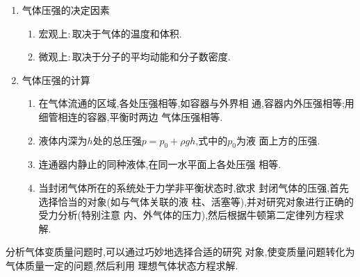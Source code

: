 \begin{enumerate}
\begin{enumerate}
\end{enumerate}


\end{enumerate}		


\begin{enumerate}
\renewcommand{\labelenumi}{\arabic{enumi}.}
\item
气体压强的决定因素
\begin{enumerate}
\renewcommand{\labelenumii}{(\arabic{enumii})}

\item 
宏观上$ : $取决于气体的温度和体积.

\item 
微观上$ : $取决于分子的平均动能和分子数密度.


\end{enumerate}
\item 
气体压强的计算	
\begin{enumerate}
\renewcommand{\labelenumii}{(\arabic{enumii})}

\item 
在气体流通的区域,各处压强相等,如容器与外界相
通,容器内外压强相等;用细管相连的容器,平衡时两边
气体压强相等.

\item 
液体内深为$ h $处的总压强$ p=p_{0}+\rho gh $,式中的$ p_{0} $为液
面上方的压强.

\item 
连通器内静止的同种液体,在同一水平面上各处压强
相等.

\item 
当封闭气体所在的系统处于力学非平衡状态时,欲求
封闭气体的压强,首先选择恰当的对象(如与气体关联的液
柱、活塞等),并对研究对象进行正确的受力分析(特别注意
内、外气体的压力),然后根据牛顿第二定律列方程求解.


\end{enumerate}

\end{enumerate}




分析气体变质量问题时,可以通过巧妙地选择合适的研究
对象,使变质量问题转化为气体质量一定的问题,然后利用
理想气体状态方程求解.


